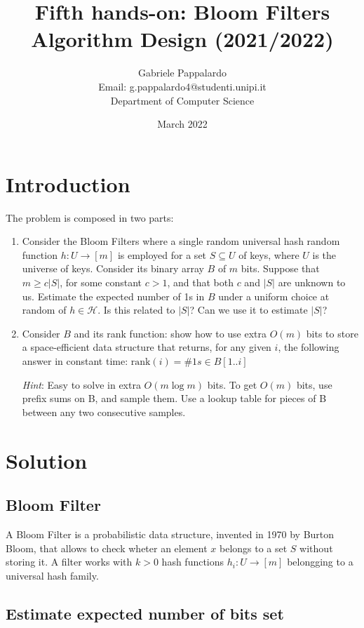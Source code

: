 \documentclass{article}
\title{Fifth hands-on: Bloom Filters \\[1ex] \large Algorithm Design (2021/2022)}
\author{Gabriele Pappalardo\\Email: g.pappalardo4@studenti.unipi.it\\Department of Computer Science}
\date{March 2022}
\begin{document}
\maketitle

\section{Introduction}

The problem is composed in two parts:

\begin{enumerate}
    \item Consider the Bloom Filters where a single random universal hash random function $h : U \to [m]$ is employed for a set $S \subseteq U$ of keys, where $U$ is the universe of keys.
    Consider its binary array $B$ of $m$ bits. Suppose that $m \ge c|S|$, for some constant $c > 1$, and that both $c$ and $|S|$ are unknown to us.   
    Estimate the expected number of 1s in $B$ under a uniform choice at random of $h \in \mathcal{H}$. Is this related to $|S|$? Can we use it to estimate $|S|$? 
    
    \item Consider $B$ and its rank function: show how to use extra $O(m)$ bits to store a space-efficient data structure that returns, for any given $i$, the following answer in constant time: 
    $\textrm{rank}(i) = \#1s \in B[1..i]$
    
    \textit{Hint}: Easy to solve in extra $O(m \log m)$ bits. To get $O(m)$ bits, use prefix sums on B, and sample them. Use a lookup table for pieces of B between any two consecutive samples. 
\end{enumerate}

\section{Solution}

\subsection{Bloom Filter}

A Bloom Filter is a probabilistic data structure, invented in 1970 by Burton Bloom, that allows to check wheter an element $x$ belongs to a set $S$ without storing it.
A filter works with $k > 0$ hash functions $h_i: U \to [m]$ belongging to a universal hash family.

\subsection{Estimate expected number of bits set}
\end{document}
